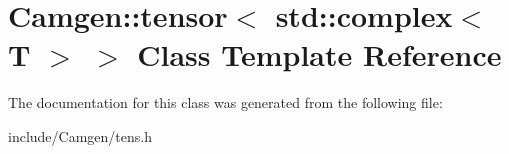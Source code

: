 \hypertarget{a00542}{}\section{Camgen\+:\+:tensor$<$ std\+:\+:complex$<$ T $>$ $>$ Class Template Reference}
\label{a00542}


The documentation for this class was generated from the following file\+:\begin{DoxyCompactItemize}
\item 
include/\+Camgen/tens.\+h\end{DoxyCompactItemize}
